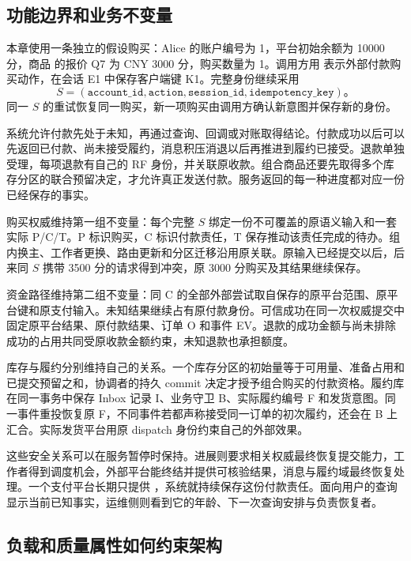 \subsection{功能边界和业务不变量}

本章使用一条独立的假设购买：Alice 的账户编号为 1，平台初始余额为 10000 分，商品  的报价 Q7 为 CNY 3000 分，购买数量为 1。调用方用  表示外部付款购买动作，在会话 E1 中保存客户端键 K1。完整身份继续采用
\[
S=(\texttt{account\_id},\texttt{action},\texttt{session\_id},\texttt{idempotency\_key})\text{。}
\]
同一 $S$ 的重试恢复同一购买，新一项购买由调用方确认新意图并保存新的身份。

系统允许付款先处于未知，再通过查询、回调或对账取得结论。付款成功以后可以先返回已付款、尚未接受履约，消息积压消退以后再推进到履约已接受。退款单独受理，每项退款有自己的 RF 身份，并关联原收款。组合商品还要先取得多个库存分区的联合预留决定，才允许真正发送付款。服务返回的每一种进度都对应一份已经保存的事实。

购买权威维持第一组不变量：每个完整 $S$ 绑定一份不可覆盖的原语义输入和一套实际 P/C/T。P 标识购买，C 标识付款责任，T 保存推动该责任完成的待办。组内换主、工作者更换、路由更新和分区迁移沿用原关联。原输入已经提交以后，后来同 $S$ 携带 3500 分的请求得到冲突，原 3000 分购买及其结果继续保存。

资金路径维持第二组不变量：同 C 的全部外部尝试取自保存的原平台范围、原平台键和原支付输入。未知结果继续占有原付款身份。可信成功在同一次权威提交中固定原平台结果、原付款结果、订单 O 和事件 EV。退款的成功金额与尚未排除成功的占用共同受原收款金额约束，未知退款也承担额度。

库存与履约分别维持自己的关系。一个库存分区的初始量等于可用量、准备占用和已提交预留之和，协调者的持久 commit 决定才授予组合购买的付款资格。履约库在同一事务中保存 Inbox 记录 I、业务守卫 B、实际履约编号 F 和发货意图。同一事件重投恢复原 F，不同事件若都声称接受同一订单的初次履约，还会在 B 上汇合。实际发货平台用原 dispatch 身份约束自己的外部效果。

这些安全关系可以在服务暂停时保持。进展则要求相关权威最终恢复提交能力，工作者得到调度机会，外部平台能终结并提供可核验结果，消息与履约域最终恢复处理。一个支付平台长期只提供 ，系统就持续保存这份付款责任。面向用户的查询显示当前已知事实，运维侧则看到它的年龄、下一次查询安排与负责恢复者。

\subsection{负载和质量属性如何约束架构}

